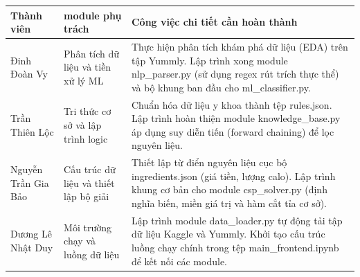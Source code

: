 \documentclass[a4paper, 12pt]{article}
\begin{document}
\begin{table}[h!]
    \centering
    \renewcommand{\arraystretch}{1.3}
    \begin{tabularx}{\textwidth}{|p{3.5cm}|p{4cm}|X|}
        \hline
        \textbf{Thành viên} & \textbf{module phụ trách} & \textbf{Công việc chi tiết cần hoàn thành} \\
        \hline
        Đinh Đoàn Vy & Phân tích dữ liệu và tiền xử lý ML & Thực hiện phân tích khám phá dữ liệu (EDA) trên tập Yummly. Lập trình xong module {nlp\_parser.py} (sử dụng regex rút trích thực thể) và bộ khung ban đầu cho {ml\_classifier.py}. \\
        \hline
        Trần Thiên Lộc & Tri thức cơ sở và lập trình logic & Chuẩn hóa dữ liệu y khoa thành tệp {rules.json}. Lập trình hoàn thiện module {knowledge\_base.py} áp dụng suy diễn tiến (forward chaining) để lọc nguyên liệu. \\
        \hline
        Nguyễn Trần Gia Bảo & Cấu trúc dữ liệu và thiết lập bộ giải & Thiết lập từ điển nguyên liệu cục bộ {ingredients.json} (giá tiền, lượng calo). Lập trình khung cơ bản cho module {csp\_solver.py} (định nghĩa biến, miền giá trị và hàm cắt tỉa cơ sở). \\
        \hline
        Dương Lê Nhật Duy & Môi trường chạy và luồng dữ liệu & Lập trình module {data\_loader.py} tự động tải tập dữ liệu Kaggle và Yummly. Khởi tạo cấu trúc luồng chạy chính trong tệp {main\_frontend.ipynb} để kết nối các module. \\
        \hline
    \end{tabularx}
\end{table}
\end{document}
